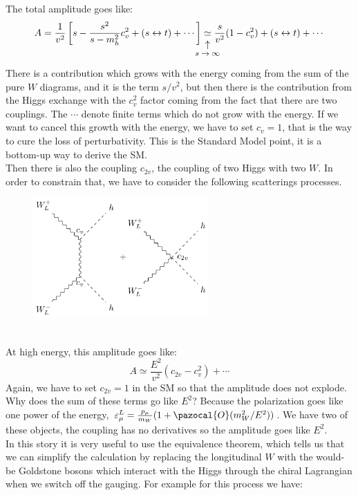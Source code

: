 \documentclass[../main.tex]{subfiles}
\begin{document}
The total amplitude goes like:
\[
A=\frac{1}{v^2}\left[s-\frac{s^2}{s-m_h^2}c_v^2+(s\leftrightarrow t)+\cdots\right]\underset{\mathclap{\tikz \node {$\uparrow$} node [below=1ex] {\footnotesize  $s\to\infty$};}}{\simeq}\frac{s}{v^2}(1-c_v^2)+(s\leftrightarrow t)+\cdots
\]
There is a contribution which grows with the energy coming from the sum of the pure $W$ diagrams, and it is the term $s/v^2$, but then there is the contribution from the Higgs exchange with the $c_v^2$ factor coming from the fact that there are two couplings. The $\cdots$ denote finite terms which do not grow with the energy. If we want to cancel this growth with the energy, we have to set $c_v=1$, that is the way to cure the loss of perturbativity. This is the Standard Model point, it is a bottom-up way to derive the SM.\\
Then there is also the coupling $c_{2v}$, the coupling of two Higgs with two $W$. In order to constrain that, we have to consider the following scatterings processes.\\
\begin{figure}[h]
    \centering
    \includegraphics[width=0.6\textwidth]{Images/wlh.pdf}
    \caption*{}
\end{figure}\\
At high energy, this amplitude goes like:
\[
A\simeq\frac{E^2}{v^2}(c_{2v}-c_v^2)+\cdots
\]
Again, we have to set $c_{2v}=1$ in the SM so that the amplitude does not explode. Why does the sum of these terms go like $E^2$? Because the polarization goes like one power of the energy, $\varepsilon_\mu^L=\frac{p_\mu}{m_W}(1+\pazocal{O}(m_W^2/E^2))$. We have two of these objects, the coupling has no derivatives so the amplitude goes like $E^2$.\\
In this story it is very useful to use the equivalence theorem, which tells us that we can simplify the calculation by replacing the longitudinal $W$ with the would-be Goldstone bosons which interact with the Higgs through the chiral Lagrangian when we switch off the gauging. For example for this process we have:\\
\end{document}
